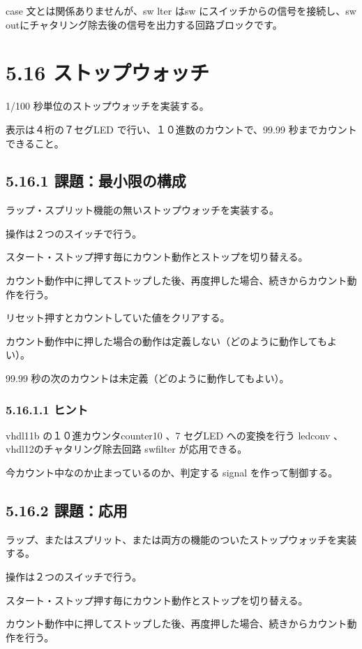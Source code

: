 \documentclass[letterpaper,10pt,dvipdfmx]{sphinxmanual}
\begin{document}
case 文とは関係ありませんが、sw lter はsw にスイッチからの信号を接続し、sw outにチャタリング除去後の信号を出力する回路ブロックです。


\section{5.16 ストップウォッチ}
\label{05_try:id25}
1/100 秒単位のストップウォッチを実装する。

表示は４桁の７セグLED で行い、１０進数のカウントで、99.99 秒までカウントできること。


\subsection{5.16.1 課題：最小限の構成}
\label{05_try:id26}
ラップ・スプリット機能の無いストップウォッチを実装する。

操作は２つのスイッチで行う。

スタート・ストップ押す毎にカウント動作とストップを切り替える。

カウント動作中に押してストップした後、再度押した場合、続きからカウント動作を行う。

リセット押すとカウントしていた値をクリアする。

カウント動作中に押した場合の動作は定義しない（どのように動作してもよい）。

99.99 秒の次のカウントは未定義（どのように動作してもよい）。


\subsubsection{5.16.1.1 ヒント}
\label{05_try:id27}
vhdl11b の１０進カウンタcounter10 、7 セグLED への変換を行う ledconv 、vhdl12のチャタリング除去回路 swfilter が応用できる。

今カウント中なのか止まっているのか、判定する signal を作って制御する。


\subsection{5.16.2 課題：応用}
\label{05_try:id28}
ラップ、またはスプリット、または両方の機能のついたストップウォッチを実装する。

操作は２つのスイッチで行う。

スタート・ストップ押す毎にカウント動作とストップを切り替える。

カウント動作中に押してストップした後、再度押した場合、続きからカウント動作を行う。
\end{document}
